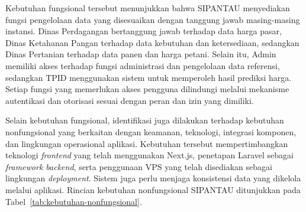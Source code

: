 Kebutuhan fungsional tersebut menunjukkan bahwa SIPANTAU menyediakan fungsi pengelolaan data yang disesuaikan dengan tanggung jawab masing-masing instansi. Dinas Perdagangan bertanggung jawab terhadap data harga pasar, Dinas Ketahanan Pangan terhadap data kebutuhan dan ketersediaan, sedangkan Dinas Pertanian terhadap data panen dan harga petani. Selain itu, Admin memiliki akses terhadap fungsi administrasi dan pengelolaan data referensi, sedangkan TPID menggunakan sistem untuk memperoleh hasil prediksi harga. Setiap fungsi yang memerlukan akses pengguna dilindungi melalui mekanisme autentikasi dan otorisasi sesuai dengan peran dan izin yang dimiliki.

Selain kebutuhan fungsional, identifikasi juga dilakukan terhadap kebutuhan nonfungsional yang berkaitan dengan keamanan, teknologi, integrasi komponen, dan lingkungan operasional aplikasi. Kebutuhan tersebut mempertimbangkan teknologi \textit{frontend} yang telah menggunakan Next.js, penetapan Laravel sebagai \textit{framework backend}, serta penggunaan VPS yang telah disediakan sebagai lingkungan \textit{deployment}. Sistem juga perlu menjaga konsistensi data yang dikelola melalui aplikasi. Rincian kebutuhan nonfungsional SIPANTAU ditunjukkan pada Tabel~\ref{tab:kebutuhan-nonfungsional}.

